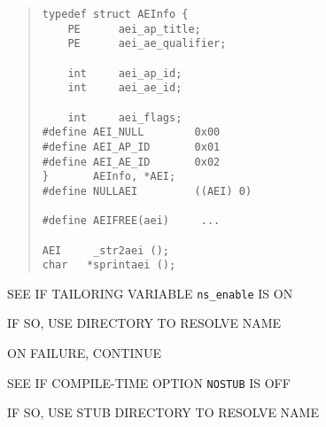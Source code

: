 \begin{bwslide}

\begin{quote}\small\begin{verbatim}
typedef struct AEInfo {
    PE      aei_ap_title;
    PE      aei_ae_qualifier;

    int     aei_ap_id;
    int     aei_ae_id;

    int     aei_flags;
#define AEI_NULL        0x00
#define AEI_AP_ID       0x01
#define AEI_AE_ID       0x02
}       AEInfo, *AEI;
#define NULLAEI         ((AEI) 0)

#define AEIFREE(aei)     ...

AEI     _str2aei ();
char   *sprintaei ();
\end{verbatim}\end{quote}
\end{bwslide}


\begin{bwslide}

\begin{nrtc}
\item	SEE IF TAILORING VARIABLE \verb"ns_enable" IS ON
    \begin{nrtc}
    \item	IF SO, USE DIRECTORY TO RESOLVE NAME
    \end{nrtc}
    ON FAILURE, CONTINUE

\item	SEE IF COMPILE-TIME OPTION \verb"NOSTUB" IS OFF
    \begin{nrtc}
    \item	IF SO, USE STUB DIRECTORY TO RESOLVE NAME
    \end{nrtc}
\end{nrtc}
\end{bwslide}


